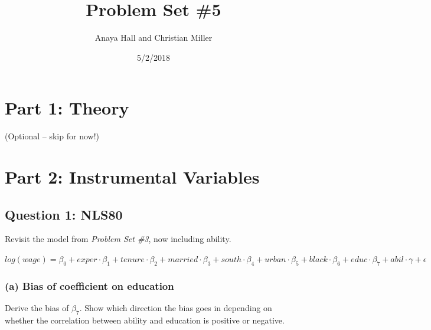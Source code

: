 \documentclass[11pt,]{article}
\title{Problem Set \#5}
\author{Anaya Hall and Christian Miller}
\date{5/2/2018}
\newenvironment{Shaded}{\begin{snugshade}}{\end{snugshade}}
\newcommand{\KeywordTok}[1]{\textcolor[rgb]{0.13,0.29,0.53}{\textbf{#1}}}
\newcommand{\StringTok}[1]{\textcolor[rgb]{0.31,0.60,0.02}{#1}}
\newcommand{\CommentTok}[1]{\textcolor[rgb]{0.56,0.35,0.01}{\textit{#1}}}
\newcommand{\OperatorTok}[1]{\textcolor[rgb]{0.81,0.36,0.00}{\textbf{#1}}}
\newcommand{\NormalTok}[1]{#1}
\begin{document}
\maketitle

\section{Part 1: Theory}\label{part-1-theory}

(Optional -- skip for now!)

\section{Part 2: Instrumental
Variables}\label{part-2-instrumental-variables}

\subsection{Question 1: NLS80}\label{question-1-nls80}

Revisit the model from \emph{Problem Set \#3}, now including ability.

\(log(wage) = \beta_0 + exper \cdot \beta_1 + tenure \cdot \beta_2 + married \cdot \beta_3 + south \cdot \beta_4 + urban \cdot \beta_5 + black \cdot \beta_6 + educ \cdot \beta_7 + abil \cdot \gamma + \epsilon\)

\begin{Shaded}
\end{Shaded}

\subsubsection{(a) Bias of coefficient on
education}\label{a-bias-of-coefficient-on-education}

Derive the bias of \(\beta_7\). Show which direction the bias goes in
depending on whether the correlation between ability and education is
positive or negative.
\end{document}
